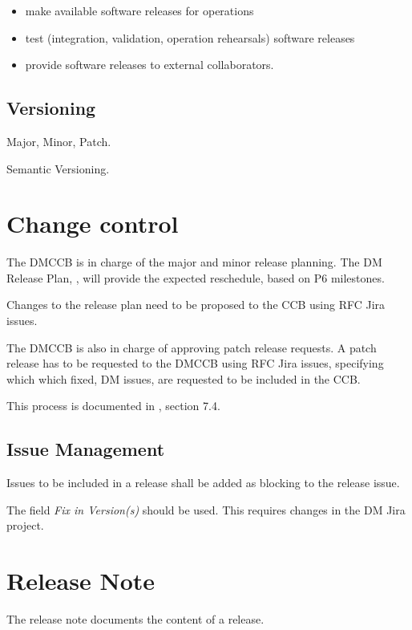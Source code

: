 \begin{itemize}
\item make available software releases for operations
\item test (integration, validation, operation rehearsals) software releases
\item provide software releases to external collaborators.
\end{itemize}

\newpage
\subsection{Versioning} \label{sect:versioning}

Major, Minor, Patch.

Semantic Versioning.


\newpage
\section{Change control} \label{sect:changecontrol}
The DMCCB is in charge of the major and minor release planning.
The DM Release Plan,  , will provide the expected reschedule, based on P6 milestones.

Changes to the release plan need to be proposed to the CCB using RFC Jira issues.

The DMCCB is also in charge of approving patch release requests.
A patch release has to be requested to the DMCCB using RFC Jira issues, specifying  which which fixed, DM issues, are requested to be included in the CCB.

This process is documented in , section 7.4.

\subsection{Issue Management} \label{sect:issues}

Issues to be included in a release shall be added as blocking to the release issue.

The field \textit{Fix in Version(s)} should be used. This requires changes in the DM Jira project.


\newpage
\section{Release Note} \label{sect:relnote}
The release note documents the content of a release.

